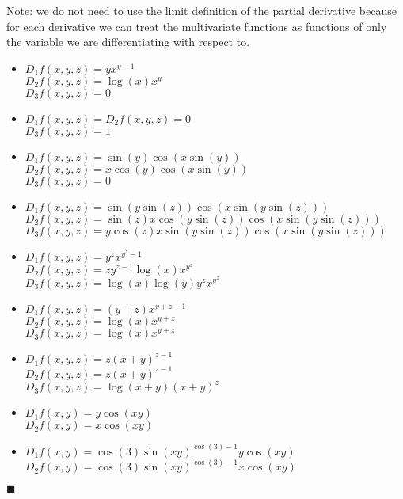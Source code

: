 \documentclass[12pt]{article}
\renewcommand{\qed}{\hfill$\blacksquare$}
\renewenvironment{proof}{\begin{addmargin}[1em]{0em}\begin{newproof}}{\end{newproof}\end{addmargin}\qed}
\begin{document}
\begin{proof}
Note: we do not need to use the limit definition of the partial derivative because for each derivative we can treat the multivariate functions as functions of only the variable we are differentiating with respect to. \\
\begin{itemize}
	\item $ D_1 f\left(x,y,z\right) = y x^{y-1}$ \\ $D_2 f\left(x,y,z\right) = \log\left(x\right) x^y$ \\$D_3 f\left(x,y,z\right) = 0$
	\item $D_1 f\left(x,y,z\right) = D_2 f\left(x,y,z\right) = 0$ \\ $D_3 
f\left(x,y,z\right) = 1$
	\item $D_1 f\left(x,y,z\right) = \sin \left(y\right) \cos\left(x\sin \left(y\right)\right)$ \\ $D_2f\left(x,y,z\right) = x\cos\left(y\right) \cos\left(x\sin\left(y\right)\right)$ \\ $D_3 f\left(x,y,z\right)=0$
	\item $D_1 f\left(x,y,z\right) = \sin\left(y \sin\left(z\right)\right) \cos\left(x\sin \left(y\sin \left(z\right)\right)\right) $ \\ $D_2 f\left(x,y,z\right) = \sin\left(z\right) x\cos \left(y\sin\left(z\right)\right) \cos \left(x\sin \left(y\sin\left(z\right)\right)\right)$ \\ $D_3 f\left(x,y,z\right) = y\cos \left(z\right) x\sin \left(y\sin\left(z\right)\right) \cos\left(x\sin\left(y\sin\left(z\right)\right)\right) $
	\item $D_1 f\left(x,y,z\right) = y^z x^{y^z-1}$\\ $D_2 f\left(x,y,z\right) = zy^{z-1} \log\left(x\right) x^{y^z}$\\ $D_3 f\left(x,y,z\right) = \log\left(x\right) \log\left(y\right) y^z x^{y^z}$
	\item $D_1 f\left(x,y,z\right) = \left(y+z\right) x^{y+z-1}$\\ $D_2 f\left(x,y,z\right) = \log\left(x\right) x^{y+z}$ \\ $D_3 f\left(x,y,z\right) = \log\left(x\right) x^{y+z} $
	\item $D_1 f\left(x,y,z\right) = z \left(x+y\right)^{z-1}$\\ $D_2 f\left(x,y,z\right) = z\left(x+y\right)^{z-1}$ \\ $D_3 f\left(x,y,z\right) = \log\left(x+y\right) \left(x+y\right)^z$
	\item $D_1 f\left(x,y\right) = y\cos\left(xy\right)$ \\ $D_2 f\left(x,y\right) = x\cos\left(xy\right)$
	\item $D_1 f\left(x,y\right) = \cos \left(3\right) \sin\left(xy\right)^{\cos\left(3\right)-1} y\cos\left(xy\right)$ \\ $D_2 f\left(x,y\right) = \cos \left(3\right) \sin\left(xy\right)^{\cos\left(3\right)-1} x\cos\left(xy\right)$
\end{itemize}
\end{proof}
\end{document}
